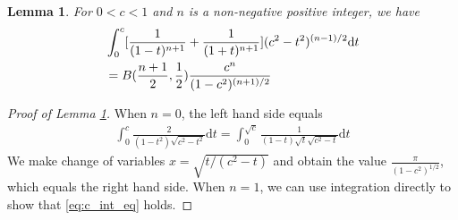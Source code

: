 \documentclass[conference,a4paper]{IEEEtran}
\def\dd{\mathrm{d}}
\newtheorem{lemma}{Lemma}
\begin{document}
\begin{lemma}\label{lem:cn_integration}
For $0<c<1$ and $n$ is a non-negative positive integer, we have
\begin{align}
    &\int_0^{c}
    [\frac{1}{(1-t)^{n+1}}+\frac{1}{(1+t)^{n+1}}]
    (c^2- t^2)^{(n-1)/2}\dd t\notag\\
    &=B(\frac{n+1}{2}, \frac{1}{2})
    \frac{c^n}{(1-c^2)^{(n+1)/2}}\label{eq:c_int_eq}
    \end{align}
\end{lemma}
\begin{proof}[Proof of Lemma \ref{lem:cn_integration}]
     When $n=0$, the left hand side equals
     \begin{align*}
          \int_0^c \frac{2}{(1-t^2)\sqrt{c^2-t^2}} \dd t
          = \int_0^{\sqrt{c}} \frac{1}{(1-t) \sqrt{t} \sqrt{c^2-t} }\dd t
     \end{align*}     
     We make change of variables $x=\sqrt{t/(c^2-t)}$ and obtain
     the value $\frac{\pi}{(1-c^2)^{1/2}}$, which equals
     the right hand side.
     When $n=1$, we can use integration directly
     to show that \eqref{eq:c_int_eq} holds.


\end{proof}
\end{document}
